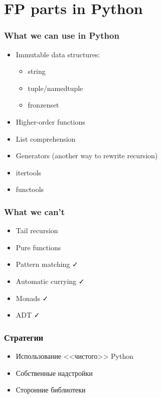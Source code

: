 \documentclass[14pt, compress, aspectratio=169]{beamer}
\def\check{\textcolor{check}{\FA \faCheck}}
\begin{document}
\section{FP parts in Python}

\begin{frame}
    \frametitle{What we can use in Python}
    \vspace{-25pt}
    \begin{itemize}[label={\MVRightarrow}]
        \item Immutable data structures:
            \begin{itemize}
                \item string
                \item tuple/namedtuple
                \item fronzenset
            \end{itemize}
        \item Higher-order functions
        \item List comprehension
        \item Generators (another way to rewrite recursion)
        \item itertools
        \item functools
    \end{itemize}
\end{frame}

\begin{frame}
    \frametitle{What we can't}
    \begin{itemize}[label={\MVRightarrow}]
        \item Tail recursion
        \item Pure functions
        \item Pattern matching \check
        \item Automatic currying \check
        \item Monads \check
        \item ADT \check
    \end{itemize}
\end{frame}

\begin{frame}
    \frametitle{Стратегии}
    \begin{itemize}[label={\MVRightarrow}]
        \item Использование <<чистого>> Python
        \item Собственные надстройки
        \item Сторонние библиотеки
    \end{itemize}
\end{frame}
\end{document}
